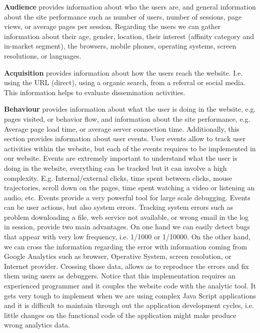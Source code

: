 \documentclass{article}
\begin{document}
\textbf{Audience} provides information about who the users are, and general information about the site performance such as number of users, number of sessions, page views, or average pages per session. Regarding the users we can gather information about their age, gender, location, their interest (affinity category and in-market segment), the browsers, mobile phones, operating systems, screen resolutions, or languages. 
   
\textbf{Acquisition} provides information about how the users reach the website. I.e. using the URL (direct), using a organic search, from a referral or social media. This information helps to evaluate dissemination activities.   

\textbf{Behaviour} provides information about what the user is doing in the website, e.g. pages visited, or behavior flow, and information about the site performance, e.g. Average page load time, or average server connection time. Additionally, this section provides information about user events. User events allow to track user activities within the website, but each of the events requires to be implemented in our website. Events are extremely important to understand what the user is doing in the website, everything can be tracked but it can involve a high complexity. E.g. Internal/external clicks, time spent between clicks, mouse trajectories, scroll down on the pages, time spent watching a video or listening an audio, etc. Events provide a very powerful tool for large scale debugging. Events can be user actions, but also system errors. Tracking system errors such as problem downloading a file, web service not available, or wrong email in the log in session, provide two main advantages. On one hand we can easily detect bugs that appear with very low frequency, i.e. 1/1000 or 1/10000. On the other hand, we can cross the information regarding the error with information coming from Google Analytics such as browser, Operative System, screen resolution, or Internet provider. Crossing those data, allows as to reproduce the errors and fix them using users as debuggers. Notice that this implementation requires an experienced programmer and it couples the website code with the analytic tool. It gets very tough to implement when we are using complex Java Script applications and it is difficult to maintain through out the application development cycles, i.e. little changes on the functional code of the application might make produce wrong analytics data.  

   
  
\end{document}

